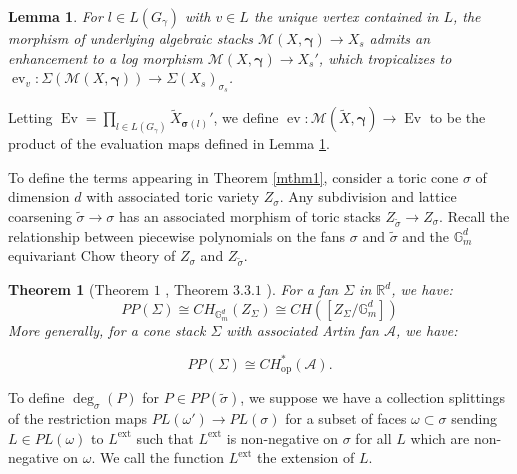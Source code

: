 \documentclass[12pt, oneside]{amsart}   	%
\newcounter{thm}
\newtheorem{theorem}[thm]{Theorem}
\newtheorem{lemma}[thm]{Lemma}
\newcommand{\ev}{\operatorname{ev}}
\newcommand{\Ev}{\operatorname{Ev}}
\numberwithin{equation}{section}
\numberwithin{thm}{section}
\numberwithin{figure}{section}
\begin{document}
\begin{lemma}\label{logenh}
For $l \in L(G_{\gamma})$ with $v \in L$ the unique vertex contained in $L$, the morphism of underlying algebraic stacks $\mathscr{M}(X,\pmb\gamma) \rightarrow X_s$ admits an enhancement to a log morphism $\mathscr{M}(X,\pmb\gamma) \rightarrow X_s'$, which tropicalizes to $\ev_v: \Sigma(\mathscr{M}(X,\pmb\gamma))  \rightarrow \Sigma(X_s)_{\sigma_s}$.
 \end{lemma}
 
Letting $\Ev = \prod_{l \in L(G_{\gamma})} \widetilde{X}_{\pmb\sigma(l)}'$, we define $\ev: \mathscr{M}(\widetilde{X},\pmb\gamma) \rightarrow \Ev$ to be the product of the evaluation maps defined in Lemma \ref{logenh}.

To define the terms appearing in Theorem \ref{mthm1}, consider a toric cone $\sigma$ of dimension $d$ with associated toric variety $Z_{\sigma}$. Any subdivision and lattice coarsening $\widetilde{\sigma} \rightarrow \sigma$ has an associated morphism of toric stacks $Z_{\widetilde{\sigma}} \rightarrow Z_{\sigma}$. Recall the relationship between piecewise polynomials on the fans $\sigma$ and $\widetilde{\sigma}$ and the $\mathbb{G}_m^d$ equivariant Chow theory of $Z_{\sigma}$ and $Z_{\widetilde{\sigma}}$. 

\begin{theorem}[Theorem $1$ \cite{ppchow}, Theorem $3.3.1$ \cite{logint}]
For a fan $\Sigma$ in $\mathbb{R}^{d}$, we have:
\[PP(\Sigma) \cong CH_{\mathbb{G}_m^d}(Z_\Sigma) \cong CH([Z_{\Sigma}/\mathbb{G}_m^d])\]
More generally, for a cone stack $\Sigma$ with associated Artin fan $\mathcal{A}$, we have:

\[PP(\Sigma) \cong CH_{\text{op}}^*(\mathcal{A}).\]
\end{theorem}

To define $\deg_{\sigma}(P)$ for $P \in PP(\widetilde{\sigma})$, we suppose we have a collection splittings of the restriction maps $PL(\omega') \rightarrow PL(\sigma)$ for a subset of faces $\omega \subset \sigma$ sending $L \in PL(\omega)$ to $L^{\text{ext}}$ such that  $L^{\text{ext}}$ is non-negative on $\sigma$ for all $L$ which are non-negative on $\omega$. We call the function $L^{\text{ext}}$ the extension of $L$. 
\end{document}
